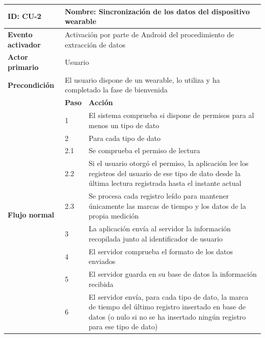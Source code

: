             \begin{table}[h]
                \centering
                \begin{tabularx}{\textwidth}{|l|l|X|}
                    \hline
                    \textbf{ID:} CU-2 & \multicolumn{2}{|X|}{\textbf{Nombre}: Sincronización de los datos del dispositivo \gls{wearable}} \\
                    \hline
                    \textbf{Evento activador} & \multicolumn{2}{|X|}{Activación por parte de Android del procedimiento de extracción de datos} \\
                    \hline
                    \textbf{Actor primario} & \multicolumn{2}{|X|}{Usuario} \\
                    \hline
                    \textbf{Precondición} & \multicolumn{2}{|X|}{El usuario dispone de un \gls{wearable}, lo utiliza  y ha completado la fase de bienvenida} \\
                    \hline
                    \multirow{11}{*}{\textbf{Flujo normal}} & \textbf{Paso} & \textbf{Acción} \\
                    \cline{2-3} & 1 & El sistema comprueba si dispone de permisos para al menos un tipo de dato \\
                    \cline{2-3} & 2 & Para cada tipo de dato \\
                    \cline{2-3} & 2.1 & Se comprueba el permiso de lectura \\
                    \cline{2-3} & 2.2 & Si el usuario otorgó el permiso, la aplicación lee los registros del usuario de ese tipo de dato desde la última lectura registrada hasta el instante actual \\
                    \cline{2-3} & 2.3 & Se procesa cada registro leído para mantener únicamente las marcas de tiempo y los datos de la propia medición \\
                    \cline{2-3} & 3 & La aplicación envía al servidor la información recopilada junto al identificador de usuario \\
                    \cline{2-3} & 4 & El servidor comprueba el formato de los datos enviados  \\
                    \cline{2-3} & 5 & El servidor guarda en su base de datos la información recibida \\
                    \cline{2-3} & 6 & El servidor envía, para cada tipo de dato, la marca de tiempo del último registro insertado en base de datos (o nulo si no se ha insertado ningún registro para ese tipo de dato) \\

\end{tabularx}
\end{table}
